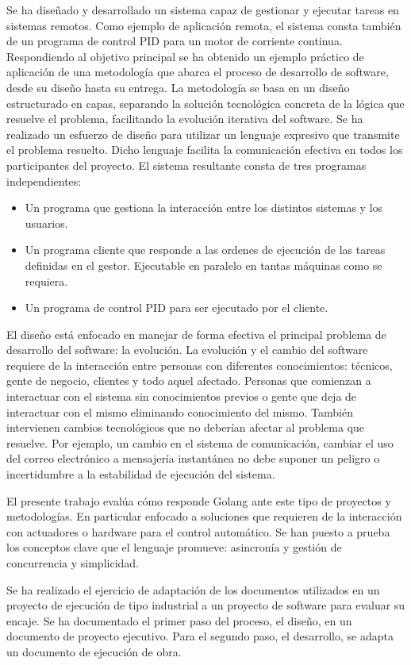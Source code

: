 
Se ha diseñado y desarrollado un sistema capaz de gestionar y ejecutar tareas en sistemas remotos.
Como ejemplo de aplicación remota, el sistema consta también de un programa de control PID para un motor de corriente continua.
Respondiendo al objetivo principal se ha obtenido un ejemplo práctico de aplicación de una metodología que abarca el proceso de desarrollo de software, desde su diseño hasta su entrega.
La metodología se basa en un diseño estructurado en capas, separando la solución tecnológica concreta de la lógica que resuelve el problema, facilitando la evolución iterativa del software.
Se ha realizado un esfuerzo de diseño para utilizar un lenguaje expresivo que transmite el problema resuelto.
Dicho lenguaje facilita la comunicación efectiva en todos los participantes del proyecto.
El sistema resultante consta de tres programas independientes:

\begin{itemize}
    \item Un programa que gestiona la interacción entre los distintos sistemas y los usuarios.
    \item Un programa cliente que responde a las ordenes de ejecución de las tareas definidas en el gestor.
    Ejecutable en paralelo en tantas máquinas como se requiera.
    \item Un programa de control PID para ser ejecutado por el cliente.
\end{itemize}

El diseño está enfocado en manejar de forma efectiva el principal problema de desarrollo del software: la evolución.
La evolución y el cambio del software requiere de la interacción entre personas con diferentes conocimientos: técnicos, gente de negocio, clientes y todo aquel afectado.
Personas que comienzan a interactuar con el sistema sin conocimientos previos o gente que deja de interactuar con el mismo eliminando conocimiento del mismo.
También intervienen cambios tecnológicos que no deberían afectar al problema que resuelve.
Por ejemplo, un cambio en el sistema de comunicación, cambiar el uso del correo electrónico a mensajería instantánea no debe suponer un peligro o incertidumbre a la estabilidad de ejecución del sistema.

El presente trabajo evalúa cómo responde Golang ante este tipo de proyectos y metodologías.
En particular enfocado a soluciones que requieren de la interacción con actuadores o hardware para el control automático.
Se han puesto a prueba los conceptos clave que el lenguaje promueve: asincronía y gestión de concurrencia y simplicidad.

Se ha realizado el ejercicio de adaptación de los documentos utilizados en un proyecto de ejecución de tipo industrial a un proyecto de software para evaluar su encaje.
Se ha documentado el primer paso del proceso, el diseño, en un documento de proyecto ejecutivo.
Para el segundo paso, el desarrollo, se adapta un documento de ejecución de obra.


